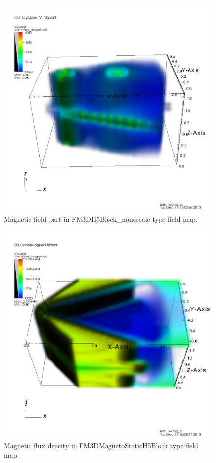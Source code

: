\documentclass[a4paper,11pt]{article}
\begin{document}
\begin{appendices}
\begin{figure}[H]
\begin{center}
\includegraphics[width=1\textwidth]{visit0002.jpeg}
\end{center}
\caption{Magnetic field part in FM3DH5Block\_nonescale type field map.\label{fig:emm}}
\end{figure}

\begin{figure}[H]
\begin{center}
\includegraphics[width=1\textwidth]{visit_Real_mag.jpeg}
\end{center}
\caption{Magnetic flux density in FM3DMagnetoStaticH5Block type field map.\label{fig:mgm}}
\end{figure}

\end{appendices}     
\end{document}
